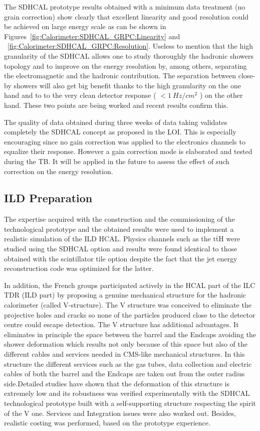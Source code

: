 The SDHCAL prototype results obtained with a minimum data treatment (no grain
correction) show clearly that excellent linearity and good resolution could be
achieved on large energy scale as can be shown in Figures~\ref{fig:Calorimeter:SDHCAL_GRPC:Linearity} and ~\ref{fig:Calorimeter:SDHCAL_GRPC:Resolution}. Useless to
mention that the high granularity of the SDHCAL allows one to study thoroughly
the hadronic showers topology and to improve on the energy resolution by, among
others, separating the electromagnetic and the hadronic contribution. The
separation between close-by showers will also get big benefit thanks to the high
granularity on the one hand and to to the very clean detector response ( $< \SI{1}{Hz/cm^2}$ )
on the other hand. These two points are being worked and recent results confirm this.

The quality of data obtained during three weeks of data taking validates
completely the SDHCAL concept as proposed in the LOI. This is especially
encouraging since no gain correction was applied to the electronics channels to
equalize their response. However a gain correction mode is elaborated and tested
during the TB. It will be applied in the future to assess the effect of such
correction on the energy resolution.


\subsection{ILD Preparation}

The expertise acquired with the construction and
the commissioning of the technological prototype and the obtained results were
used to implement a realistic simulation of the ILD HCAL. Physics channels such
as the $\mathrm{t} \bar{\mathrm{t}}\mathrm{H}$ were studied using the SDHCAL option and results were found
identical to those obtained with the scintillator tile option despite the fact
that the jet energy reconstruction code was optimized for the latter.

In addition, the French groups participated actively in the HCAL part of the
ILC TDR (ILD part) by proposing a genuine mechanical structure for the hadronic
calorimeter (called V-structure). The V structure was conceived to eliminate
the projective holes and cracks so none of the particles produced close to the
detector centre could escape detection. The V structure has additional
advantages. It eliminates in principle the space between the barrel and the
Endcaps avoiding the shower deformation which results not only because of
this space but also of the different cables and services needed in CMS-like
mechanical structures. In this structure the different services such as the
gas tubes, data collection and electric cables of both the barrel and the
Endcaps are taken out from the outer radius side.Detailed studies have shown
that the deformation of this structure is extremely low and its robustness was
verified experimentally with the SDHCAL technological prototype built with a
self-supporting structure respecting the spirit of the V one. Services and
Integration issues were also worked out. Besides, realistic costing was
performed, based on the prototype experience.

